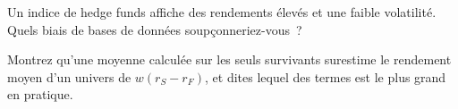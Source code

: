 \begin{interviewq}\label{iq:rs:point-in-time-data-and-the-biases:5}
Un indice de hedge funds affiche des rendements élevés et une faible volatilité. Quels biais de bases de données soupçonneriez-vous~?
\end{interviewq}

\begin{interviewq}\label{iq:rs:point-in-time-data-and-the-biases:6}
Montrez qu'une moyenne calculée sur les seuls survivants surestime le rendement moyen d'un univers de $w(r_S - r_F)$, et dites lequel des termes est le plus grand
en pratique.
\end{interviewq}
